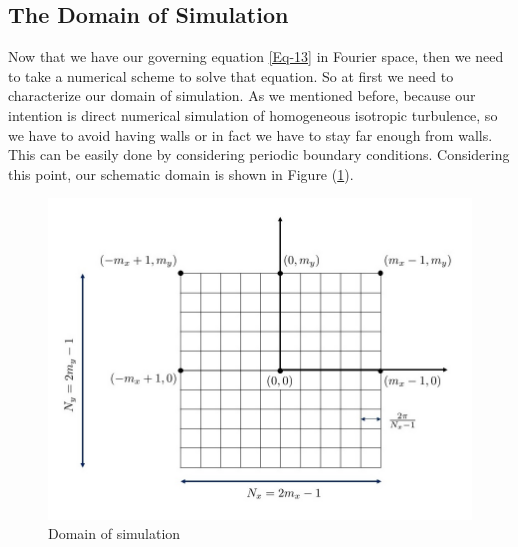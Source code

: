 \documentclass[12pt]{article}
\begin{document}
\subsection{The Domain of Simulation}
Now that we have our governing equation \eqref{Eq-13} in Fourier space, then we need to take a numerical scheme to solve that equation. So at first we need to characterize our domain of simulation. As we mentioned before, because our intention is direct numerical simulation of homogeneous isotropic turbulence, so we have to avoid having walls or in fact we have to stay far enough from walls. This can be easily done by considering periodic boundary conditions. Considering this point, our schematic domain is shown in Figure (\ref{Fig-1}). 
\begin{figure}[h]
\centering
\includegraphics{domain}
\caption{Domain of simulation}\label{Fig-1}
\end{figure}
%
\end{document}

